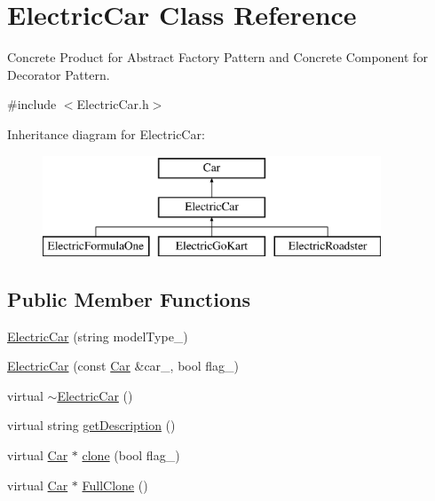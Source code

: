 \hypertarget{class_electric_car}{}\section{Electric\+Car Class Reference}
\label{class_electric_car}


Concrete Product for Abstract Factory Pattern and Concrete Component for Decorator Pattern.  




{\ttfamily \#include $<$Electric\+Car.\+h$>$}

Inheritance diagram for Electric\+Car\+:\begin{figure}[H]
\begin{center}
\leavevmode
\includegraphics[height=3.000000cm]{class_electric_car}
\end{center}
\end{figure}
\subsection*{Public Member Functions}
\begin{DoxyCompactItemize}
\item 
\mbox{\hyperlink{class_electric_car_a39c61284beee09357e58de1a532e26a0}{Electric\+Car}} (string model\+Type\+\_\+)
\item 
\mbox{\hyperlink{class_electric_car_a552446ff18f08c5e3420c4a9f7a86e77}{Electric\+Car}} (const \mbox{\hyperlink{class_car}{Car}} \&car\+\_\+, bool flag\+\_\+)
\item 
virtual \mbox{\hyperlink{class_electric_car_afd84f09e8cf25d68770a55580ffad16c}{$\sim$\+Electric\+Car}} ()
\item 
virtual string \mbox{\hyperlink{class_electric_car_a62d6d62f65e193c0e9f7b79faf2a280f}{get\+Description}} ()
\item 
virtual \mbox{\hyperlink{class_car}{Car}} $\ast$ \mbox{\hyperlink{class_electric_car_a852de7d2208dea4d45a554d9270508d0}{clone}} (bool flag\+\_\+)
\item 
virtual \mbox{\hyperlink{class_car}{Car}} $\ast$ \mbox{\hyperlink{class_electric_car_a97eec3669ad8f20128eaab3084f8f8f5}{Full\+Clone}} ()
\end{DoxyCompactItemize}
